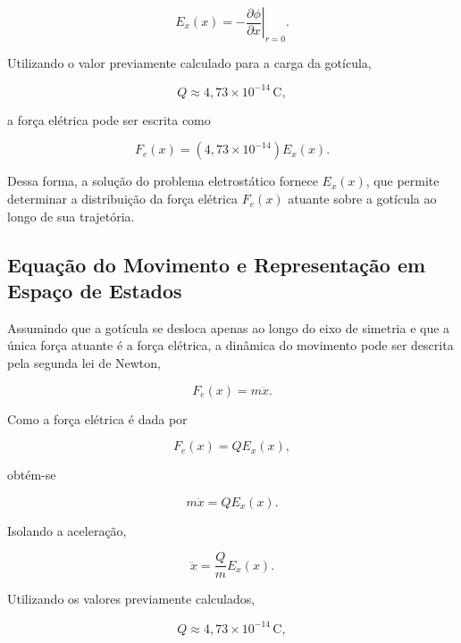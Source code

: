 \documentclass[12pt,a4paper]{article}
\begin{document}
\begin{equation}
E_x(x)
=
-
\left.
\frac{\partial \phi}{\partial x}
\right|_{r=0}.
\end{equation}

Utilizando o valor previamente calculado para a carga da gotícula,

\begin{equation}
Q
\approx
4{,}73 \times 10^{-14}\,\text{C},
\end{equation}

a força elétrica pode ser escrita como

\begin{equation}
F_e(x)
=
\left(
4{,}73 \times 10^{-14}
\right)
E_x(x).
\end{equation}

Dessa forma, a solução do problema eletrostático fornece $E_x(x)$, que permite
determinar a distribuição da força elétrica $F_e(x)$ atuante sobre a gotícula ao
longo de sua trajetória.

\subsection{Equação do Movimento e Representação em Espaço de Estados}

Assumindo que a gotícula se desloca apenas ao longo do eixo de simetria e que
a única força atuante é a força elétrica, a dinâmica do movimento pode ser
descrita pela segunda lei de Newton,

\begin{equation}
F_e(x)
=
m\ddot{x}.
\end{equation}

Como a força elétrica é dada por

\begin{equation}
F_e(x)
=
Q E_x(x),
\end{equation}

obtém-se

\begin{equation}
m\ddot{x}
=
Q E_x(x).
\end{equation}

Isolando a aceleração,

\begin{equation}
\ddot{x}
=
\frac{Q}{m}
E_x(x).
\end{equation}

Utilizando os valores previamente calculados,

\begin{equation}
Q
\approx
4{,}73 \times 10^{-14}\,\text{C},
\end{equation}
\end{document}
